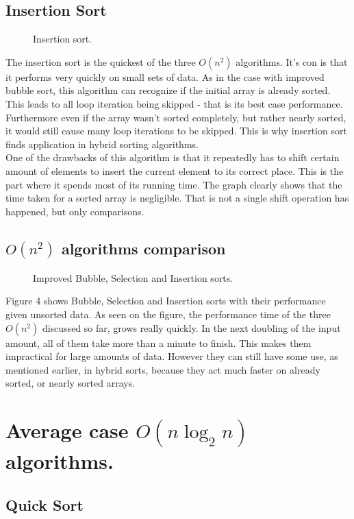 \documentclass{acm_proc_article-sp}
\begin{document}
\subsection{Insertion Sort}
\begin{figure}[h]
\caption{Insertion sort.}
\end{figure}
The insertion sort is the quickest of the three $O(n^2)$ algorithms. It's con is that it performs very quickly on small sets of data. As in the case with improved bubble sort, this algorithm can recognize if the initial array is already sorted. This leads to all loop iteration being skipped - that is its best case performance. Furthermore even if the array wasn't sorted completely, but rather nearly sorted, it would still cause many loop iterations to be skipped. This is why  insertion sort finds application in hybrid sorting algorithms. \\
One of the drawbacks of this algorithm is that it repeatedly has to shift certain amount of elements to insert the current element to its correct place. This is the part where it spends most of its running time. The graph clearly shows that the time taken for a sorted array is negligible. That is not a single shift operation has happened, but only comparisons.
\subsection{$O(n^2)$ algorithms comparison} 
\begin{figure}[h]
\caption{Improved Bubble, Selection and Insertion sorts.}
\end{figure}
Figure 4 shows  Bubble, Selection and Insertion sorts with their performance given unsorted data. As seen on the figure, the performance time of the three $O(n^2)$ discussed so far, grows really quickly. In the next doubling of the input amount, all of them take more than a minute to finish. This makes them impractical for large amounts of data. However they can still have some use, as mentioned earlier, in hybrid sorts, because they act much faster on already sorted, or nearly sorted arrays.
\section{Average case $O(n \log_2 n)$ algorithms.} 
\subsection{Quick Sort}
\end{document}
